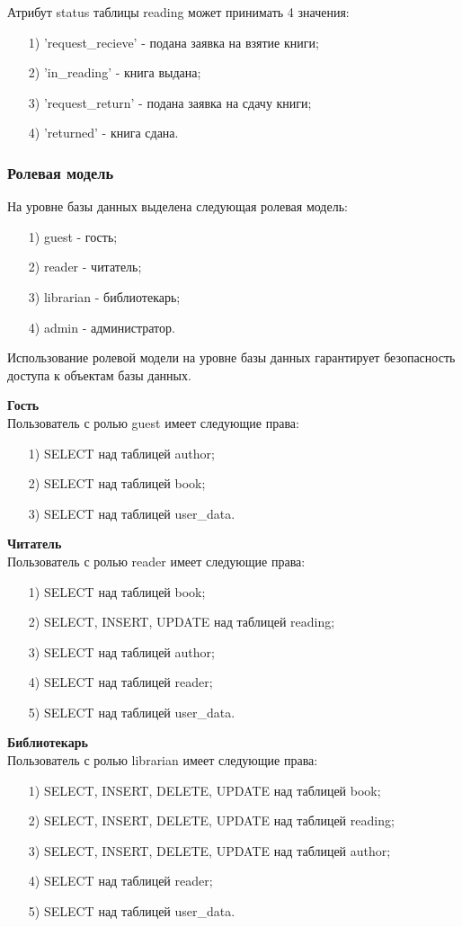 Атрибут status таблицы reading может принимать 4 значения:
\begin{itemize}
	\item[1)] 'request\_recieve' - подана заявка на взятие книги;
	\item[2)] 'in\_reading' - книга выдана;
	\item[3)] 'request\_return' - подана заявка на сдачу книги;
	\item[4)] 'returned' - книга сдана.
\end{itemize}

\subsubsection{Ролевая модель}
На уровне базы данных выделена следующая ролевая модель:
\begin{itemize}
	\item[1)] guest - гость;
	\item[2)] reader - читатель;
	\item[3)] librarian - библиотекарь;
	\item[4)] admin - администратор.  
\end{itemize}
Использование ролевой модели на уровне базы данных гарантирует безопасность доступа к объектам базы данных.

\textbf{Гость}\\
Пользователь с ролью guest имеет следующие права:
\begin{itemize}
	\item[1)] SELECT над таблицей author;
	\item[2)] SELECT над таблицей book; 
	\item[3)] SELECT над таблицей user\_data.    
\end{itemize}

\textbf{Читатель}\\
Пользователь с ролью reader имеет следующие права:
\begin{itemize}
	\item[1)] SELECT над таблицей book;
	\item[2)] SELECT, INSERT, UPDATE над таблицей reading; 
	\item[3)] SELECT над таблицей author;
	\item[4)] SELECT над таблицей reader;
	\item[5)] SELECT над таблицей user\_data.
\end{itemize}

\textbf{Библиотекарь}\\
Пользователь с ролью librarian имеет следующие права:
\begin{itemize}
	\item[1)] SELECT, INSERT, DELETE, UPDATE над таблицей book;
	\item[2)] SELECT, INSERT, DELETE, UPDATE над таблицей reading; 
	\item[3)] SELECT, INSERT, DELETE, UPDATE над таблицей author;
	\item[4)] SELECT над таблицей reader;
	\item[5)] SELECT над таблицей user\_data.
\end{itemize}


